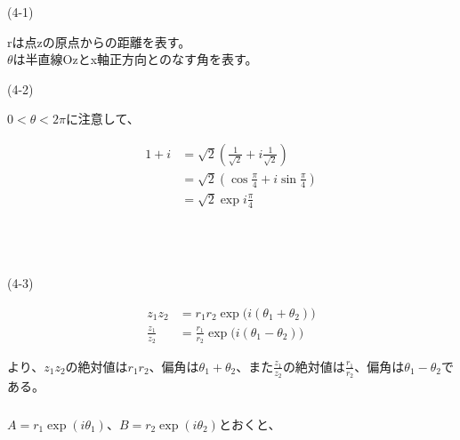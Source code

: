 \documentclass[dvipdfmx,a4paper]{jsarticle}
\begin{document}
\subsubsection{}

\begin{flushleft}
(4-1)
\end{flushleft}
rは点zの原点からの距離を表す。\\
$\theta$は半直線Ozとx軸正方向とのなす角を表す。\\


\begin{flushleft}
(4-2)
\end{flushleft}

$0 < \theta < 2\pi$に注意して、

\begin{align*}
1 + i &= \sqrt{2}(\frac{1}{\sqrt{2}} + i\frac{1}{\sqrt{2}})\\
&= \sqrt{2}(\cos{\frac{\pi}{4}}+ i\sin{\frac{\pi}{4}})\\
&= \sqrt{2}\exp{i\frac{\pi}{4}}
\end{align*}
\\
\\
\\

\begin{flushleft}
(4-3)
\end{flushleft}
 
 \begin{align*}
 z_1z_2 &= r_1r_2\exp{\bigl(i(\theta_1+\theta_2)\bigr)}\\
 \frac{z_1}{z_2} &= \frac{r_1}{r_2}\exp{\bigl(i(\theta_1-\theta_2)\bigr)}
 \end{align*}
 
 より、$z_1z_2$の絶対値は$r_1r_2$、偏角は$\theta_1+\theta_2$、また$\frac{z_1}{z_2}$の絶対値は$\frac{r_1}{r_2}$、偏角は$\theta_1-\theta_2$である。
 
 \subsubsection{}
 
 $A = r_1\exp{(i\theta_1)}$、$B = r_2\exp{(i\theta_2)}$とおくと、
 
\end{document}
